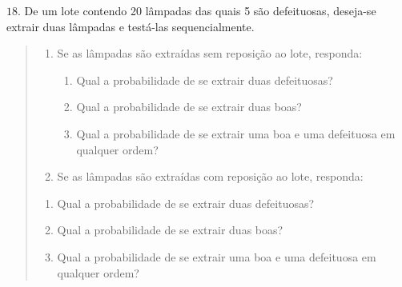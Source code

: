 \(18.\) De um lote contendo 20 lâmpadas das quais 5 são defeituosas, deseja-se extrair duas lâmpadas e testá-las sequencialmente.
\begin{quote}
\begin{enumerate}
\item {} 
Se as lâmpadas são extraídas sem reposição ao lote, responda:
\begin{enumerate}
\item {} 
Qual a probabilidade de se extrair duas defeituosas?

\item {} 
Qual a probabilidade de se extrair duas boas?

\item {} 
Qual a probabilidade de se extrair uma boa e uma defeituosa em qualquer ordem?

\end{enumerate}

\item {} 
Se as lâmpadas são extraídas com reposição ao lote, responda:

\end{enumerate}
\begin{enumerate}
\item {} 
Qual a probabilidade de se extrair duas defeituosas?

\item {} 
Qual a probabilidade de se extrair duas boas?

\item {} 
Qual a probabilidade de se extrair uma boa e uma defeituosa em qualquer ordem?

\end{enumerate}
\end{quote}

